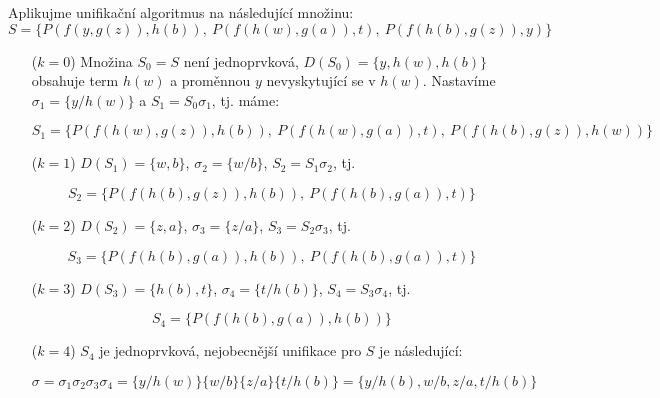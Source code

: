 \begin{example}
Aplikujme unifikační algoritmus na následující množinu:
$$
S=\{P(f(y,g(z)),h(b)),\ P(f(h(w),g(a)),t),\ P(f(h(b),g(z)),y)\}
$$
\begin{itemize}
    \item[($k=0$)] Množina $S_0=S$ není jednoprvková, $D(S_0)=\{y,h(w),h(b)\}$ obsahuje term $h(w)$ a proměnnou $y$ nevyskytující se v $h(w)$. Nastavíme $\sigma_1=\{y/h(w)\}$ a $S_1=S_0\sigma_1$, tj. máme:

    $$S_1=\{P(f(h(w),g(z)),h(b)),\ P(f(h(w),g(a)),t),\ P(f(h(b),g(z)),h(w))\}$$

    \item[($k=1$)] $D(S_1)=\{w,b\}$, $\sigma_2=\{w/b\}$, $S_2=S_1\sigma_2$, tj.

    $$S_2=\{P(f(h(b),g(z)),h(b)),\ P(f(h(b),g(a)),t)\}$$

    \item[($k=2$)] $D(S_2)=\{z,a\}$, $\sigma_3=\{z/a\}$, $S_3=S_2\sigma_3$, tj.

    $$S_3=\{P(f(h(b),g(a)),h(b)),\ P(f(h(b),g(a)),t)\}$$

    \item[($k=3$)] $D(S_3)=\{h(b),t\}$, $\sigma_4=\{t/h(b)\}$, $S_4=S_3\sigma_4$, tj.

    $$S_4=\{P(f(h(b),g(a)),h(b))\}$$

    \item[($k=4$)] $S_4$ je jednoprvková, nejobecnější unifikace pro $S$ je následující:

    $$
    \sigma=\sigma_1\sigma_2\sigma_3\sigma_4=\{y/h(w)\}\{w/b\}\{z/a\}\{t/h(b)\}=\{y/h(b),w/b,z/a,t/h(b)\}
    $$
\end{itemize}
\end{example}

